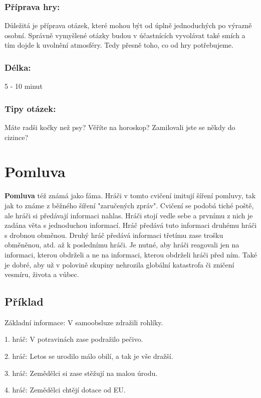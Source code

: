 \documentclass[main.tex]{subfiles}
\begin{document}
\subsubsection{Příprava hry:} Důležitá je příprava otázek, které mohou být od úplně jednoduchých po výrazně osobní. Správně vymyšlené otázky budou v účastnících vyvolávat také smích a tím dojde k uvolnění atmosféry. Tedy přesně toho, co od hry potřebujeme. 
 
\subsubsection{Délka:} 5 - 10 minut 
 
\subsubsection{Tipy otázek:} Máte radši kočky než psy? 
Věříte na horoskop? 
Zamilovali jste se někdy do cizince? 
 
 
 
 
\needspace{5cm} \section{Pomluva} \label{pomluva} \textbf{Pomluva}{} též známá jako fáma. Hráči v tomto cvičení imitují šíření pomluvy, tak jak to známe z běžného šíření "zaručených zpráv". Cvičení se podobá tiché poště, ale hráči si předávají informaci nahlas. Hráči stojí vedle sebe a prvnímu z nich je zadána věta s jednoduchou informací. Hráč předává tuto informaci druhému hráči s drobnou obměnou. Druhý hráč předává informaci třetímu zase trošku obměněnou, atd. až k poslednímu hráči. Je nutné, aby hráči reagovali jen na informaci, kterou obdrželi a ne na informaci, kterou obdrželi hráči před ním. Také je dobré, aby už v polovině skupiny nehrozila globální katastrofa či zničení vesmíru, života a vůbec. 
 
 
\subsection{Příklad}  
Základní informace: V samoobsluze zdražili rohlíky. 
 
1. hráč: V potravinách zase podražilo pečivo. 
 
2. hráč: Letos se urodilo málo obilí, a tak je vše dražší. 
 
3. hráč: Zemědělci si zase stěžují na malou úrodu. 
 
4. hráč: Zemědělci chtějí dotace od EU. 
 
\end{document}
